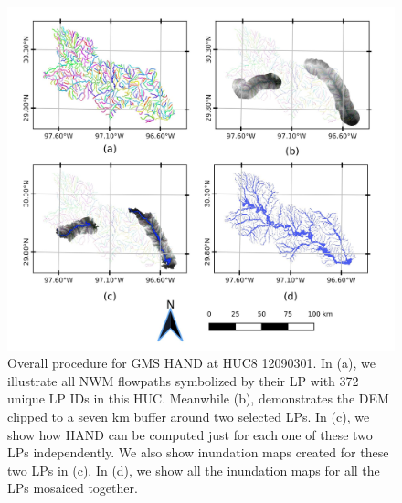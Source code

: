 \begin{figure}[H]
\centering
\includegraphics[scale=1.0]{figures/gms_methods.jpg}
\caption{Overall procedure for GMS HAND at HUC8 12090301.
In (a), we illustrate all NWM flowpaths symbolized by their LP with 372 unique LP IDs in this HUC.
Meanwhile (b), demonstrates the DEM clipped to a seven km buffer around two selected LPs.
In (c), we show how HAND can be computed just for each one of these two LPs independently. 
We also show inundation maps created for these two LPs in (c). 
In (d), we show all the inundation maps for all the LPs mosaiced together. }
\label{fig:gms_methods}
\end{figure}
%
%

